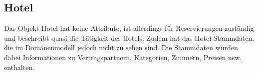 \documentclass[../../Pflichtenheft.tex]{subfiles}
\begin{document}
    \subsection{Hotel}
    Das Objekt Hotel hat keine Attribute, ist allerdings für Reservierungen zuständig und beschreibt
    quasi die Tätigkeit des Hotels. Zudem hat das Hotel Stammdaten, die im Domänenmodell jedoch
    nicht zu sehen sind. Die Stammdaten würden dabei Informationen zu Vertragspartnern, Kategorien, Zimmern, Preisen
    usw. enthalten.
\end{document}

